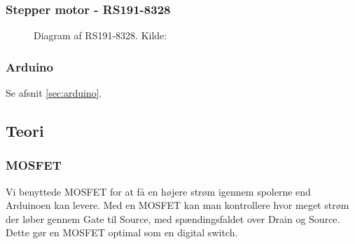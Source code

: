 \subsubsection{Stepper motor - RS191-8328}
\begin{figure}[H]
	\centering
	\caption{Diagram af RS191-8328. Kilde: \cite{kompstepmotor}}
	    \label{fig:kompstepper}
\end{figure}


\subsubsection{Arduino}
Se afsnit \ref{sec:arduino}.

\subsection{Teori}
\subsubsection{MOSFET}
Vi benyttede MOSFET for at få en højere strøm igennem spolerne end Arduinoen kan levere. Med en MOSFET kan man kontrollere hvor meget strøm der løber gennem Gate til Source, med spændingsfaldet over Drain og Source. Dette gør en MOSFET optimal som en digital switch. 
